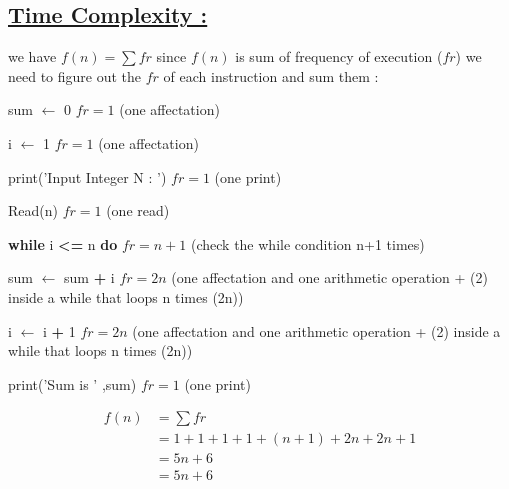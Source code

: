 \newpage
\subsection*{\underline{Time Complexity :}}
we have \(f(n) = \sum fr\) since \(f(n)\) is sum of frequency of execution (\(fr\)) we need to figure out the
\(fr\) of each instruction and sum them : 

\vspace{0.5cm}
sum $\gets$ 0  \hspace{4.15cm} \(fr = 1\) (one affectation)

\vspace{0.15cm}
i $\gets$ 1  \hspace{4.65cm} \(fr = 1\) (one affectation)

\vspace{0.15cm}
\textcolor{purplePlot!80!black}{print}(\textcolor{blueArea!60!black}{'Input Integer N : '})  \hspace{1.5cm} \(fr = 1\) (one print)

\vspace{0.15cm}
\textcolor{purplePlot!80!black}{Read}(n)  \hspace{4.25cm} \(fr = 1\) (one read)

\vspace{0.15cm}

\textbf{while} i \textcolor{redPlot}{\textbf{\textless=}} n  \textbf{do} \hspace{2.75cm} \(fr = n+1\) (check the while condition n+1 times)

\vspace{0.15cm}
sum $\gets$ sum \textcolor{redPlot}{ \textbf{+}} i \hspace{3cm} \(fr = 2n\) (one affectation and one arithmetic operation + (2) inside a while that loops n times (2n))

\vspace{0.15cm}
i $\gets$ i \textcolor{redPlot}{ \textbf{+}} 1 \hspace{4cm} \(fr = 2n\) (one affectation and one arithmetic operation + (2) inside a while that loops n times (2n))

\vspace{0.15cm}

\textcolor{purplePlot!80!black}{print}(\textcolor{blueArea!60!black}{'Sum is ' },{sum}) \hspace{2.25cm} \(fr = 1\) (one print)

\vspace{0.75cm}
\begin{align*}
f(n) &= \sum fr \\
     &= 1 + 1 + 1 + 1 + (n+1) + 2n + 2n + 1 \\
     &= 5n + 6 \\
     &= \boxed{5n + 6}
\end{align*}

